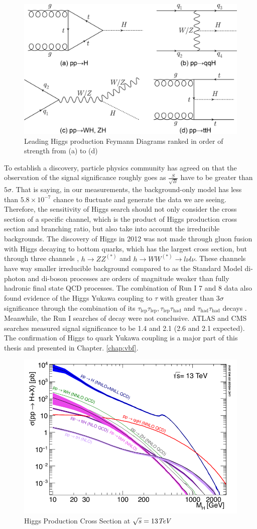\begin{figure}[htpb!]
\begin{center}
  \includegraphics[width=0.45\linewidth]{figures/theory/ProductionFeymann}
\caption{Leading Higgs production Feymann Diagrams ranked in order of strength from (a) to (d)}
\label{fig:theory-higgsfeymann}
\end{center}
\end{figure}


To establish a discovery, particle physics community has agreed on that the observation of the signal significance roughly goes as $\frac{S}{\sqrt{B}}$ have to be greater than $5\sigma$. That is saying, in our measurements, the background-only model has less than $5.8\times 10^{-7}$ chance to fluctuate and generate the data we are seeing. Therefore, the sensitivity of Higgs search should not only consider the cross section of a specific channel, which is the product of Higgs production cross section and branching ratio, but also take into account the irreducible backgrounds. The discovery of Higgs in 2012 was not made through gluon fusion with Higgs decaying to bottom quarks, which has the largest cross section, but through three channels \Hgammagamma, $h\rightarrow ZZ^{(*)}$ and $h\rightarrow WW^{(*)}\rightarrow l\nu l\nu$\cite{HIGG-2012-27,CMS-HIG-12-028}. These channels have way smaller irreducible background compared to \Hbb as the Standard Model di-photon and di-boson processes are orders of magnitude weaker than fully hadronic final state QCD processes. The combination of Run I 7 and 8 \tev data also found evidence of the Higgs Yukawa coupling to $\tau$ with greater than $3\sigma$ significance through the combination of its $\tau_{\text{lep}}\tau_{\text{lep}},\tau_{\text{lep}}\tau_{\text{had}}$ and $\tau_{\text{had}}\tau_{\text{had}}$ decays \cite{HIGG-2013-32,CMS-HIG-13-004}. Meanwhile, the Run I searches of \Hbb decay were not conclusive. ATLAS and CMS searches measured signal significance to be 1.4 and 2.1 (2.6 and 2.1 expected)\cite{HIGG-2013-23,CMS-HIG-13-012}. The confirmation of Higgs to quark Yukawa coupling is a major part of this thesis and presented in Chapter. \ref{chap:vbf}. 



\begin{figure}[htpb!]
\begin{center}
  \includegraphics[width=0.6\linewidth]{figures/theory/HiggsCrossSection.png}
\caption{Higgs Production Cross Section at $\sqrt{s}= 13\textit{TeV}$ \cite{CERN-YELLOW-BOOK}}
\label{fig:theory-higgsp}
\end{center}
\end{figure}

